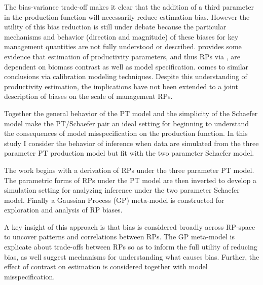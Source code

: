 \documentclass[12pt]{article}
\begin{document}
%
The bias-variance trade-off  makes it 
clear that the addition of a third parameter in the production function will 
necessarily reduce estimation bias. However the utility of this bias reduction 
is still under debate because the particular mechanisms and behavior (direction and magnitude) %
of these biases for key management quantities %
are not fully understood or described.  provides some 
evidence that estimation of productivity parameters, and thus RPs via , 
are dependent on biomass contrast as well as model specification. %
 comes to similar conclusions %
via calibration modeling techniques. Despite this understanding of productivity estimation, 
the implications have not been extended to a joint description of biases on the scale of 
management RPs. %


Together the general behavior of the PT model and the %
simplicity of the Schaefer model make the PT/Schaefer pair an ideal setting for 
beginning to understand the consequences of model misspecification on the 
production function. In this study I consider the behavior of inference when 
data are simulated from the three parameter PT production model but fit with 
the two parameter Schaefer model. 

%
The work begins with a derivation of RPs under the three parameter PT model. 
The parametric forms of RPs under the PT model are then inverted to develop a 
simulation setting for analyzing inference under the two parameter Schaefer 
model. Finally a Gaussian Process (GP) meta-model is constructed for exploration 
and analysis of RP biases. 

%
A key insight of this approach is that bias is considered broadly across RP-space to 
uncover patterns and correlations between RPs. %
The GP meta-model is explicate about trade-offs between RPs %
so as to inform the full utility of reducing bias, as well suggest mechanisms for 
understanding what causes bias. Further, the effect of contrast on estimation 
is considered together with model misspecification. %
\end{document}
